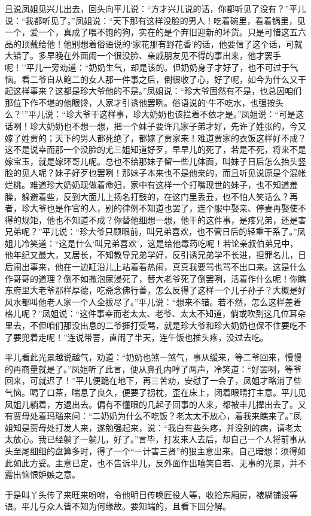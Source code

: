 且说凤姐见兴儿出去，回头向平儿说：``方才兴儿说的话，你都听见了没有？''平儿说：``我都听见了。''凤姐说：``天下那有这样没脸的男人！吃着碗里，看着锅里，见一个，爱一个，真成了喂不饱的狗，实在的是个弃旧迎新的坏货。只是可惜这五六品的顶戴给他！他别想着俗语说的`家花那有野花香'的话，他要信了这个话，可就大错了。多早晚在外面闹一个很没脸、亲戚朋友见不得的事出来，他才罢手呢！''平儿一旁劝道：``奶奶生气，却是该的。但奶奶身子才好了，也不可过于气恼。看二爷自从鲍二的女人那一件事之后，倒很收了心，好了呢，如今为什么又干起这样事来？这都是珍大爷他的不是。''凤姐说：``珍大爷固然有不是，也总因咱们那位下作不堪的他眼馋，人家才引诱他罢咧。俗语说的`牛不吃水，也强按头么？'''平儿说：``珍大爷干这样事，珍大奶奶也该拦着不依才是。''凤姐说：``可是这话咧！珍大奶奶也不想一想，把一个妹子要许几家子弟才好，先许了姓张的，今又嫁了姓贾的；天下的男人都死绝了，都嫁了贾家来！难道贾家的衣饭这样好不成？这不是说幸而那一个没脸的尤三姐知道好歹，早早儿的死了，若是不死，将来不是嫁宝玉，就是嫁环哥儿呢。总也不给那妹子留一些儿体面，叫妹子日后怎么抬头竖脸的见人呢？妹子好歹也罢咧！那妹子本来也不是他亲的，而且听见说原是个混帐烂桃。难道珍大奶奶现做着命妇，家中有这样一个打嘴现世的妹子，也不知道羞臊，躲避着些，反到大面儿上扬名打鼓的，在这门里丢丑，也不怕人笑话么？再者，珍大爷也是作官的人，别的律例不知道也罢了，连个服中娶亲、停妻再娶使不得的规矩，他也不知道不成？你替他细想一想，他干的这件事，是疼兄弟，还是害兄弟呢？''平儿说：``珍大爷只顾眼前，叫兄弟喜欢，也不管日后的轻重干系了。''凤姐儿冷笑道：``这是什么`叫兄弟喜欢'，这是给他毒药吃呢！若论亲叔伯弟兄中，他年纪又最大，又居长，不知教导兄弟学好，反引诱兄弟学不长进，担罪名儿，日后闹出事来，他在一边缸沿儿上站着看热闹，真真我要骂也骂不出口来。这是什么作哥哥的道理？倒不如撒泡尿浸死了，替大老爷死了倒罢咧，活着作什么呢！你瞧东府里大老爷那样厚德，吃斋念佛行善，怎么反得了这样一个儿子孙子？大概是好风水都叫他老人家一个人全拔尽了。''平儿说：``想来不错。若不然，怎么这样差着格儿呢？''凤姐说：``这件事幸而老太太、老爷、太太不知道，倘或吹到这几位耳朵里去，不但咱们那没出息的二爷捱打受骂，就是珍大爷和珍大奶奶也保不住要吃不了要兜着走呢！''连说带詈，直闹了半天，连午饭也推头疼，没过去吃。

平儿看此光景越说越气，劝道：``奶奶也煞一煞气，事从缓来，等二爷回来，慢慢的再商量就是了。''凤姐听了此言，便从鼻孔内哼了两声，冷笑道：``好罢咧，等爷回来，可就迟了！''平儿便跪在地下，再三苦劝，安慰了一会子，凤姐才略消了些气恼。喝了口茶，喘息了良久，便要了拐枕，歪在床上，闭着眼睛打主意。平儿见凤姐儿躺着，方退出去。偏有不懂眼的几起子回事的人来，都被丰儿撵出去了。又有贾母处着玛瑙来问：``二奶奶为什么不吃饭？老太太不放心，着我来瞧来了。''凤姐知是贾母处打发人来，遂勉强起来，说：``我白有些头疼，并没别的病，请老太太放心。我已经躺了一躺儿，好了。''言毕，打发来人去后，却自己一个人将前事从头至尾细细的盘算多时，得了一个``一计害三贤''的狠主意出来。自己暗想：须得如此如此方妥。主意已定，也不告诉平儿，反外面作出嘻笑自若、无事的光景，并不露出恼恨妒嫉之意。

于是叫丫头传了来旺来吩咐，令他明日传唤匠役人等，收拾东厢房，裱糊铺设等语。平儿与众人皆不知为何缘故。要知端的，且看下回分解。


